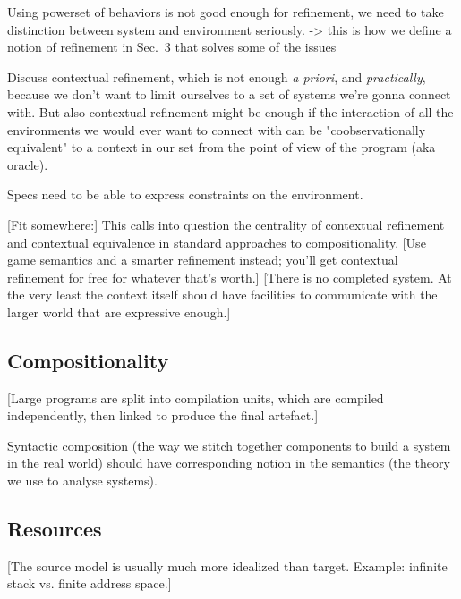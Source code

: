 \documentclass[sigplan,10pt,review,anonymous]{acmart}
\begin{document}
Using powerset of behaviors is not good enough for refinement,
we need to take distinction between system and environment seriously.
-> this is how we define a notion of refinement in Sec.~3
that solves some of the issues

Discuss contextual refinement,
which is not enough \emph{a priori}, and \emph{practically},
because we don't want to limit ourselves to a set of systems we're gonna connect with.
But also contextual refinement might be enough
if the interaction of all the environments we would ever want to connect with
can be "coobservationally equivalent" to a context in our set
from the point of view of the program (aka oracle).

Specs need to be able to express constraints on the environment.

[Fit somewhere:]
This calls into question
the centrality of contextual refinement and contextual equivalence
in standard approaches to compositionality.
[Use game semantics and a smarter refinement instead;
you'll get contextual refinement for free
for whatever that's worth.]
[There is no completed system.
At the very least the context itself
should have facilities to communicate with the larger world
that are expressive enough.]


\subsection{Compositionality} %

[Large programs are split into compilation units,
which are compiled independently,
then linked to produce the final artefact.]

Syntactic composition
(the way we stitch together components to build a system in the real world)
should have corresponding notion
in the semantics
(the theory we use to analyse systems).


\subsection{Resources} %

[The source model is usually much more idealized than target.
Example: infinite stack vs. finite address space.]



\end{document}
